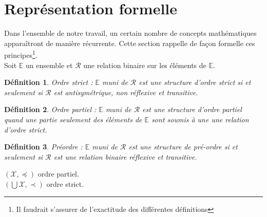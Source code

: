 \documentclass[12pt,a4paper,french]{article}
\begin{document}
\newpage
\section{Représentation formelle}

\newtheorem{definition}{Définition}
\newtheorem{lemme}{Lemme}
\newtheorem{proposition}{Proposition}
\newtheorem{theoreme}{Thorme}
\newtheorem{eg}{Exemple}
\newcommand{\ds}{\displaystyle}



Dans l'ensemble de notre travail, un certain nombre de concepts mathématiques apparaîtront de manière récurrente. Cette section rappelle de façon formelle ces principes\footnote{Il faudrait s'assurer de l'exactitude des différentes définitions}.\\

Soit $\mathbb{E}$ un ensemble et  $\mathcal{R}$ une relation binaire sur les éléments de $\mathbb{E}$. 

\begin{definition}{\emph{Ordre strict : }}
$\mathbb{E}$ muni de $\mathcal{R}$ est une structure d'ordre strict si et seulement si $\mathcal{R}$ est antisymétrique, non réflexive et transitive.\\
\end{definition}

\begin{definition}{\emph{Ordre partiel :} }
$\mathbb{E}$ muni de $\mathcal{R}$ est une structure d'ordre partiel quand une partie seulement des éléments de $\mathbb{E}$ sont soumis à une une relation d'ordre strict.\\
\end{definition}

\begin{definition}{\emph{Préordre :} }
$\mathbb{E}$ muni de $\mathcal{R}$ est une structure de pré-ordre si et seulement si $\mathcal{R}$  est une relation binaire réflexive et transitive.\\
\end{definition}



$(\mathcal{X},\preceq)$ ordre partiel. \\
$(\bigcup\mathcal{X},\prec)$ ordre strict. \\
\end{document}
